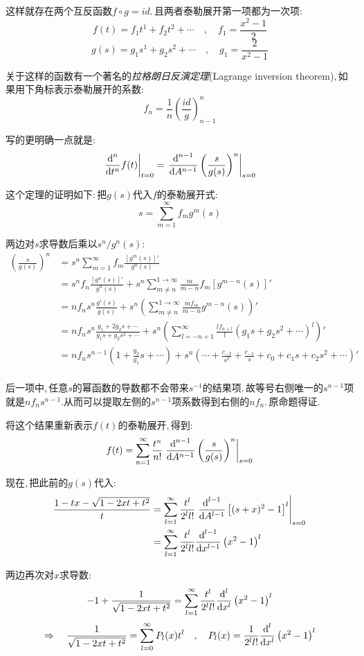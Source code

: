 这样就存在两个互反函数$f\circ g=id$.\,且两者泰勒展开第一项都为一次项:
\[f(t)=f_1t^1+f_2t^2+\cdots\quad ,\quad f_1=\frac{x^2-1}{2}\]
\[g(s)=g_1s^1+g_2s^2+\cdots\quad ,\quad g_1=\frac{2}{x^2-1}\]

关于这样的函数有一个著名的\emph{拉格朗日反演定理}(Lagrange inversion theorem),\,如果用下角标表示泰勒展开的系数:
\[f_n=\frac{1}{n}\left(\frac{id}{g}\right)^n_{n-1}\]

写的更明确一点就是:
\[\left.\frac{\textrm{d}^n}{\textrm{d} t^n}f(t)\right|_{t=0}=\left.\frac{\textrm{d}^{n-1}}{\textrm{d} A^{n-1}}\left(\frac{s}{g(s)}\right)^n\right|_{s=0}\]

这个定理的证明如下:\,把$g(s)$代入$f$的泰勒展开式:
\[s=\sum_{m=1}^\infty f_m g^m(s)\]

两边对$s$求导数后乘以$s^n/g^n(s)$:
\begin{align*}
\left(\frac{s}{g(s)}\right)^n &=s^n\sum_{m=1}^\infty f_m \frac{\left[g^m(s)\right]'}{g^n(s)}\\
&=s^nf_n\frac{\left[g^n(s)\right]'}{g^n(s)}+s^n\sum_{m\neq n}^{1\to\infty}\frac{m}{m-n}f_m\left[g^{m-n}(s)\right]'\\
&=nf_ns^n\frac{g'(s)}{g(s)}+s^n\left(\sum_{m\neq n}^{1\to\infty}\frac{mf_m}{m-n} g^{m-n}(s)\right)'\\
&=nf_ns^n\frac{g_1+2g_2s+\cdots}{g_1s+g_2s^2+\cdots}+s^n\left(\sum_{l=-n+1}^{\infty}\frac{lf_{n+l}}{l} (g_1s+g_2s^2+\cdots)^l\right)'\\
&=nf_ns^{n-1}\left(1+\frac{g_2}{g_1}s+\cdots\right) +s^n\left(\cdots+\frac{c_{-2}}{s^2}+\frac{c_{-1}}{s}+c_0+c_1s+c_2s^2+\cdots\right)'\\
\end{align*}

后一项中,\,任意$s$的幂函数的导数都不会带来$s^{-1}$的结果项.\,故等号右侧唯一的$s^{n-1}$项就是$nf_ns^{n-1}$.从而可以提取左侧的$s^{n-1}$项系数得到右侧的$nf_n$.\,原命题得证.

将这个结果重新表示$f(t)$的泰勒展开,\,得到:
\[f(t)=\sum_{n=1}^{\infty}\frac{t^n}{n!}\left.\frac{\textrm{d}^{n-1}}{\textrm{d} A^{n-1}}\left(\frac{s}{g(s)}\right)^n\right|_{s=0}\]

现在,\,把此前的$g(s)$代入:
\begin{align*}
\frac{1-tx-\sqrt{1-2xt+t^2}}{t} &=\sum_{l=1}^{\infty}\frac{t^l}{2^l l!}\left.\frac{\textrm{d}^{l-1}}{\textrm{d} A^{l-1}}\left[(s+x)^2-1\right]^l\right|_{s=0}\\
&=\sum_{l=1}^{\infty}\frac{t^l}{2^l l!}\frac{\textrm{d}^{l-1}}{\textrm{d} x^{l-1}}\left(x^2-1\right)^l
\end{align*}

两边再次对$x$求导数:
\[-1+\frac{1}{\sqrt{1-2xt+t^2}}=\sum_{l=1}^{\infty}\frac{t^l}{2^l l!}\frac{\textrm{d}^{l}}{\textrm{d} x^{l}}\left(x^2-1\right)^l\]
\[\Rightarrow\quad \frac{1}{\sqrt{1-2xt+t^2}}=\sum_{l=0}^{\infty}P_l(x)t^l\quad ,\quad P_l(x)=\frac{1}{2^l l!}\frac{\textrm{d}^{l}}{\textrm{d} x^{l}}\left(x^2-1\right)^l\]


